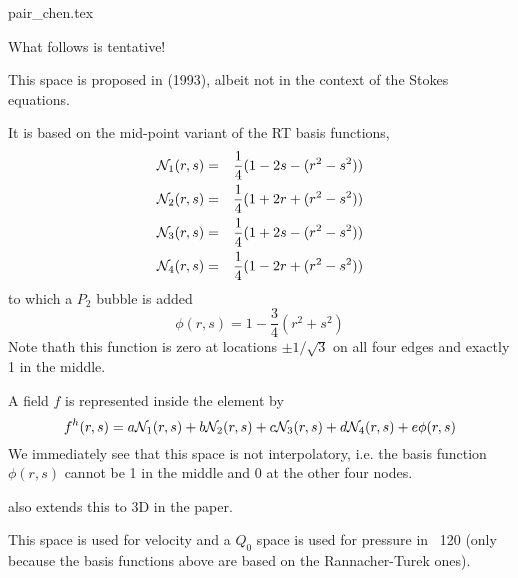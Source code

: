 \begin{flushright} {\tiny {\color{gray} pair\_chen.tex}} \end{flushright}

What follows is tentative!

This space is proposed in \textcite{chen93b} (1993), albeit not in the 
context of the Stokes equations.

It is based on the mid-point variant of the RT basis functions, 
\begin{eqnarray}
{\mathcal{N}}_1(r,s) &=& \frac{1}{4} (1-2s-(r^2-s^2)) \nonumber\\
{\mathcal{N}}_2(r,s) &=& \frac{1}{4} (1+2r+(r^2-s^2)) \nonumber\\
{\mathcal{N}}_3(r,s) &=& \frac{1}{4} (1+2s-(r^2-s^2)) \nonumber\\
{\mathcal{N}}_4(r,s) &=& \frac{1}{4} (1-2r+(r^2-s^2)) \nonumber
\end{eqnarray}
to which a $P_2$ bubble is added
\[
\phi(r,s) = 1-\frac34(r^2+s^2)
\]
Note thath this function is zero at locations $\pm 1/\sqrt{3}$ 
on all four edges and exactly 1 in the middle. 

A field $f$ is represented inside the element by 
\[
f^h(r,s)=a {\mathcal{N}}_1(r,s)
+b {\mathcal{N}}_2(r,s)
+c {\mathcal{N}}_3(r,s)
+d {\mathcal{N}}_4(r,s)
+e \phi(r,s)
\]
We immediately see that this space is not interpolatory, i.e. the basis function $\phi(r,s)$ cannot be 1 in the middle and 0 at the other four nodes. 

\textcite{chen} also extends this to 3D in the paper. 

This space is used for velocity and a $Q_0$ space is used for 
pressure in \stone~120 (only because the basis functions above are
based on the Rannacher-Turek ones).
